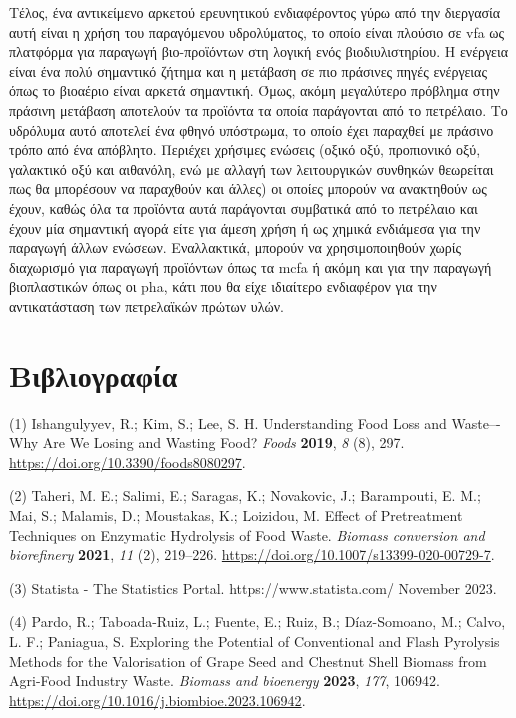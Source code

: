 \documentclass[11pt]{report}
\begin{document}
Τέλος, ένα αντικείμενο αρκετού ερευνητικού ενδιαφέροντος γύρω από την διεργασία αυτή είναι η χρήση του παραγόμενου υδρολύματος, το οποίο είναι πλούσιο σε \acrfull{vfa} ως πλατφόρμα για παραγωγή βιο-προϊόντων στη λογική ενός βιοδιυλιστηρίου. Η ενέργεια είναι ένα πολύ σημαντικό ζήτημα και η μετάβαση σε πιο πράσινες πηγές ενέργειας όπως το βιοαέριο είναι αρκετά σημαντική. Όμως, ακόμη μεγαλύτερο πρόβλημα στην πράσινη μετάβαση αποτελούν τα προϊόντα τα οποία παράγονται από το πετρέλαιο. Το υδρόλυμα αυτό αποτελεί ένα φθηνό υπόστρωμα, το οποίο έχει παραχθεί με πράσινο τρόπο από ένα απόβλητο. Περιέχει χρήσιμες ενώσεις (οξικό οξύ, προπιονικό οξύ, γαλακτικό οξύ και αιθανόλη, ενώ με αλλαγή των λειτουργικών συνθηκών θεωρείται πως θα μπορέσουν να παραχθούν και άλλες) οι οποίες μπορούν να ανακτηθούν ως έχουν, καθώς όλα τα προϊόντα αυτά παράγονται συμβατικά από το πετρέλαιο και έχουν μία σημαντική αγορά είτε για άμεση χρήση ή ως χημικά ενδιάμεσα για την παραγωγή άλλων ενώσεων. Εναλλακτικά, μπορούν να χρησιμοποιηθούν χωρίς διαχωρισμό για παραγωγή προϊόντων όπως τα \acrfull{mcfa} ή ακόμη και για την παραγωγή βιοπλαστικών όπως οι \acrfull{pha}, κάτι που θα είχε ιδιαίτερο ενδιαφέρον για την αντικατάσταση των πετρελαϊκών πρώτων υλών.

\part*{Βιβλιογραφία}
\label{sec:org26ba4d1}
\hypertarget{citeproc_bib_item_1}{(1) Ishangulyyev, R.; Kim, S.; Lee, S. H. Understanding Food Loss and Waste–-Why Are We Losing and Wasting Food? \textit{Foods} \textbf{2019}, \textit{8} (8), 297. \url{https://doi.org/10.3390/foods8080297}.}

\hypertarget{citeproc_bib_item_2}{(2) Taheri, M. E.; Salimi, E.; Saragas, K.; Novakovic, J.; Barampouti, E. M.; Mai, S.; Malamis, D.; Moustakas, K.; Loizidou, M. Effect of Pretreatment Techniques on Enzymatic Hydrolysis of Food Waste. \textit{Biomass conversion and biorefinery} \textbf{2021}, \textit{11} (2), 219–226. \url{https://doi.org/10.1007/s13399-020-00729-7}.}

\hypertarget{citeproc_bib_item_3}{(3) Statista - The Statistics Portal. https://www.statista.com/ November 2023.}

\hypertarget{citeproc_bib_item_4}{(4) Pardo, R.; Taboada-Ruiz, L.; Fuente, E.; Ruiz, B.; Díaz-Somoano, M.; Calvo, L. F.; Paniagua, S. Exploring the Potential of Conventional and Flash Pyrolysis Methods for the Valorisation of Grape Seed and Chestnut Shell Biomass from Agri-Food Industry Waste. \textit{Biomass and bioenergy} \textbf{2023}, \textit{177}, 106942. \url{https://doi.org/10.1016/j.biombioe.2023.106942}.}
\end{document}
